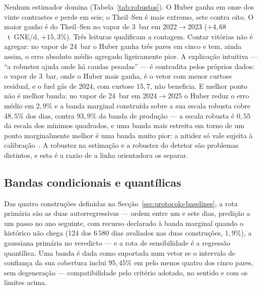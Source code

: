 Nenhum estimador domina (Tabela~\ref{tab:robustos}). O Huber ganha em onze
dos vinte contrastes e perde em seis; o Theil--Sen é mais extremo, sete
contra oito. O maior ganho é do Theil--Sen no vapor de 3~bar em
2022${\to}$2023 ($+4{,}68$~t~GNE/d, $+15{,}3\%$). Três leituras
qualificam a contagem. Contar vitórias não é agregar: no vapor de 24~bar o
Huber ganha três pares em cinco e tem, ainda assim, o erro absoluto médio
agregado ligeiramente pior. A explicação intuitiva --- ``a robustez ajuda
onde há caudas pesadas'' --- é contradita pelos próprios dados: o vapor de
3~bar, onde o Huber mais ganha, é o vetor com menor curtose residual, e o
fuel gás de 2024, com curtose $15{,}7$, não beneficia. E melhor ponto não é
melhor banda: no vapor de 24~bar em 2024${\to}$2025 o Huber reduz o erro
médio em $2{,}9\%$ e a banda marginal construída sobre a sua escala robusta
cobre $48{,}5\%$ dos dias, contra $93{,}9\%$ da banda de produção --- a
escala robusta é $0{,}55$ da escala dos mínimos quadrados, e uma banda mais
estreita em torno de um ponto marginalmente melhor é uma banda muito pior:
a nitidez só vale sujeita à calibração~\cite{Gneiting2007}.
A robustez na estimação e a robustez do detetor são problemas distintos, e
esta é a razão de a linha orientadora os separar.

\subsection{Bandas condicionais e quantílicas}
\label{sec:demo-bandas}

Das quatro construções definidas na Secção~\ref{sec:protocolo-baselines}, a
rota primária são as duas autorregressivas --- ordem entre um e sete dias,
predição a um passo no ano seguinte, com recurso declarado à banda marginal
quando o histórico não chega (124 dos $6\,580$ dias avaliados nas duas
construções, $1{,}9\%$), a gaussiana primária no veredicto --- e a rota de
sensibilidade é a regressão quantílica. Uma banda é
dada como suportada num vetor se o intervalo de confiança da sua cobertura
inclui $95{,}45\%$ em pelo menos quatro dos cinco pares, sem degeneração ---
compatibilidade pelo critério adotado, no sentido e com os limites acima.

